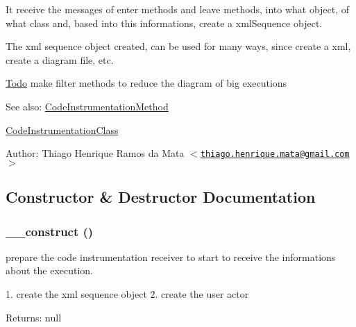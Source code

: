 It receive the messages of enter methods and leave methods, into what object, of what class and, based into this informations, create a xmlSequence object.

The xml sequence object created, can be used for many ways, since create a xml, create a diagram file, etc.

\begin{Desc}
\item[\hyperlink{todo__todo000002}{Todo}]make filter methods to reduce the diagram of big executions\end{Desc}
\begin{Desc}
\item[See also:]\hyperlink{class_code_instrumentation_method}{CodeInstrumentationMethod} 

\hyperlink{class_code_instrumentation_class}{CodeInstrumentationClass} \end{Desc}
\begin{Desc}
\item[Author:]Thiago Henrique Ramos da Mata $<$\href{mailto:thiago.henrique.mata@gmail.com}{\tt thiago.henrique.mata@gmail.com}$>$ \end{Desc}


\subsection{Constructor \& Destructor Documentation}
\hypertarget{class_code_instrumentation_receiver_095c5d389db211932136b53f25f39685}{
\subsubsection[{\_\-\_\-construct}]{\setlength{\rightskip}{0pt plus 5cm}\_\-\_\-construct ()}}
\label{class_code_instrumentation_receiver_095c5d389db211932136b53f25f39685}


prepare the code instrumentation receiver to start to receive the informations about the execution.

1. create the xml sequence object 2. create the user actor

\begin{Desc}
\item[Returns:]null \end{Desc}


